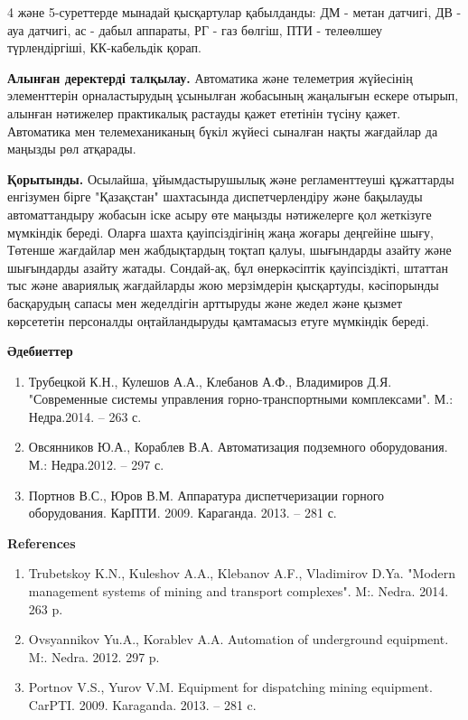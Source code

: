 \begin{multicols}{2}
4 және 5-суреттерде мынадай қысқартулар қабылданды: ДМ - метан датчигі,
ДВ - ауа датчигі, ас - дабыл аппараты, РГ - газ бөлгіш, ПТИ -
телеөлшеу түрлендіргіші, КК-кабельдік қорап.

{\bfseries Алынған деректерді талқылау.} Автоматика және телеметрия
жүйесінің элементтерін орналастырудың ұсынылған жобасының жаңалығын
ескере отырып, алынған нәтижелер практикалық растауды қажет ететінін
түсіну қажет. Автоматика мен телемеханиканың бүкіл жүйесі сыналған нақты
жағдайлар да маңызды рөл атқарады.

{\bfseries Қорытынды.} Осылайша, ұйымдастырушылық және регламенттеуші
құжаттарды енгізумен бірге "Қазақстан" шахтасында диспетчерлендіру және
бақылауды автоматтандыру жобасын іске асыру өте маңызды нәтижелерге қол
жеткізуге мүмкіндік береді. Оларға шахта қауіпсіздігінің жаңа жоғары
деңгейіне шығу, Төтенше жағдайлар мен жабдықтардың тоқтап қалуы,
шығындарды азайту және шығындарды азайту жатады. Сондай-ақ, бұл
өнеркәсіптік қауіпсіздікті, штаттан тыс және авариялық жағдайларды жою
мерзімдерін қысқартуды, кәсіпорынды басқарудың сапасы мен жеделдігін
арттыруды және жедел және қызмет көрсететін персоналды оңтайландыруды
қамтамасыз етуге мүмкіндік береді.
\end{multicols}

\begin{center}
{\bfseries Әдебиеттер}
\end{center}

\begin{enumerate}
\item
Трубецкой К.Н., Кулешов А.А., Клебанов А.Ф., Владимиров Д.Я.
"Современные системы управления горно-транспортными комплексами". М.:
Недра.2014. -- 263 с.

\item
Овсянников Ю.А., Кораблев В.А. Автоматизация подземного оборудования.
М.: Недра.2012. -- 297 с.

\item
Портнов В.С., Юров В.М. Аппаратура диспетчеризации горного
оборудования. КарПТИ. 2009. Караганда. 2013. -- 281 с.
\end{enumerate}

\begin{center}
{\bfseries References}
\end{center}

\begin{enumerate}
\item
Trubetskoy K.N., Kuleshov A.A., Klebanov A.F., Vladimirov D.Ya.
"Modern management systems of mining and transport complexes". M:.
Nedra. 2014. 263 p.

\item
Ovsyannikov Yu.A., Korablev A.A. Automation of underground equipment.
M:. Nedra. 2012. 297 p.

\item
Portnov V.S., Yurov V.M. Equipment for dispatching mining equipment.
CarPTI. 2009. Karaganda. 2013. -- 281 c.
\end{enumerate}

